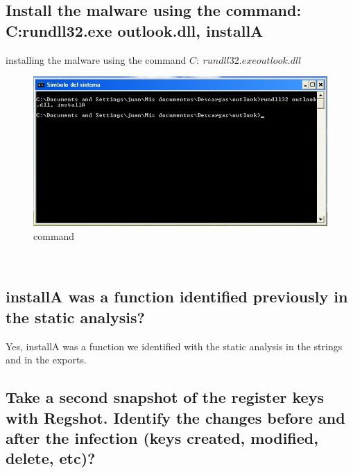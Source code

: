 \documentclass[12pt,letter]{article} %
\begin{document}
        \subsection{Install the malware using the command: C:\>rundll32.exe outlook.dll, installA}
            installing the malware using the command  $ C:\>rundll32.exe outlook.dll  $
            \\
            \begin{figure}[h!]
                \centering
                \includegraphics[width=0.5\linewidth]{punto3.jpeg}
                \caption{command}
                \label{command execution:}
            \end{figure}
            \\

        \subsection{installA was a function identified previously in the static
        analysis?}
            Yes, installA was a function we identified with the static analysis
            in the strings and in the exports.

        \newpage
        \subsection{Take a second snapshot of the register keys with Regshot.
        Identify the changes before and after the infection (keys created,
        modified, delete, etc)?}
\end{document}
